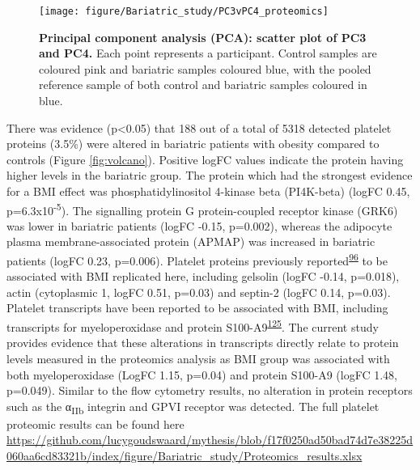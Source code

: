 \documentclass[11pt,twoside]{bristolthesis}
\begin{document}
\begin{figure}

{\centering \texttt{[image: figure/Bariatric\_study/PC3vPC4\_proteomics]} 

}

\caption[Principal component analysis (PCA): scatter plot of PC3 and PC4.]{\textbf{Principal component analysis (PCA): scatter plot of PC3 and PC4.} Each point represents a participant. Control samples are coloured pink and bariatric samples coloured blue, with the pooled reference sample of both control and bariatric samples coloured in blue.}\label{fig:pca2}
\end{figure}
There was evidence (p\textless0.05) that 188 out of a total of 5318 detected platelet proteins (3.5\%) were altered in bariatric patients with obesity compared to controls (Figure \ref{fig:volcano}). Positive logFC values indicate the protein having higher levels in the bariatric group. The protein which had the strongest evidence for a BMI effect was phosphatidylinositol 4-kinase beta (PI4K-beta) (logFC 0.45, p=6.3x10\textsuperscript{-5}). The signalling protein G protein-coupled receptor kinase (GRK6) was lower in bariatric patients (logFC -0.15, p=0.002), whereas the adipocyte plasma membrane-associated protein (APMAP) was increased in bariatric patients (logFC 0.23, p=0.006). Platelet proteins previously reported\textsuperscript{\protect\hyperlink{ref-Barrachina2019}{96}} to be associated with BMI replicated here, including gelsolin (logFC -0.14, p=0.018), actin (cytoplasmic 1, logFC 0.51, p=0.03) and septin-2 (logFC 0.14, p=0.03). Platelet transcripts have been reported to be associated with BMI, including transcripts for myeloperoxidase and protein S100-A9\textsuperscript{\protect\hyperlink{ref-Freedman2010}{125}}. The current study provides evidence that these alterations in transcripts directly relate to protein levels measured in the proteomics analysis as BMI group was associated with both myeloperoxidase (LogFC 1.15, p=0.04) and protein S100-A9 (logFC 1.48, p=0.049). Similar to the flow cytometry results, no alteration in protein receptors such as the α\textsubscript{IIb} integrin and GPVI receptor was detected. The full platelet proteomic results can be found here \url{https://github.com/lucygoudswaard/mythesis/blob/f17f0250ad50bad74d7e38225d060aa6cd83321b/index/figure/Bariatric_study/Proteomics_results.xlsx}
\end{document}
